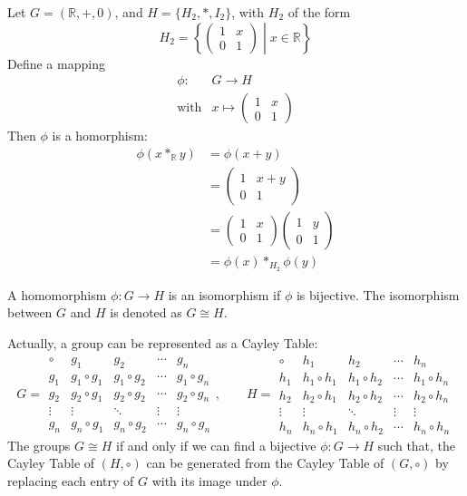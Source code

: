 \begin{example}
Let $G=(\mathbb{R},+,0)$, and $H=\{H_2,*,I_2\}$, with $H_2$ of the form
\[
H_2=\left\{
\begin{pmatrix}
1&x\\0&1
\end{pmatrix}\middle| x\in\mathbb{R}
\right\}
\]
Define a mapping
\[
\begin{array}{ll}
\phi:&G\to H\\\text{with}&x\mapsto\begin{pmatrix}
1&x\\0&1
\end{pmatrix}
\end{array}
\]
Then $\phi$ is a homorphism:
\begin{align*}
\phi(x*_{\mathbb{R}}y)&=\phi(x+y)\\
&=\begin{pmatrix}
1&x+y\\0&1
\end{pmatrix}\\
&=\begin{pmatrix}
1&x\\0&1
\end{pmatrix}\begin{pmatrix}
1&y\\0&1
\end{pmatrix}\\&=\phi(x)*_{H_2}\phi(y)
\end{align*}

\end{example}


\begin{definition}[Isomorphism]
A homomorphism $\phi:G\to H$ is an isomorphism if $\phi$ is bijective.
The isomorphism between $G$ and $H$ is denoted as $G\cong H$.
\end{definition}

Actually, a group can be represented as a Cayley Table:
\[
G=\begin{array}{c|cccc}
\circ & g_1 & g_2 & \cdots & g_n \\
\hline
g_1 & g_1\circ g_1 & g_1\circ g_2 & \cdots & g_1\circ g_n \\
g_2 & g_2\circ g_1 & g_2\circ g_2 & \cdots & g_2\circ g_n \\
\vdots & \vdots & \ddots & \vdots & \vdots \\
g_n & g_n\circ g_1 & g_n\circ g_2 & \cdots & g_n\circ g_n
\end{array},\qquad
H=\begin{array}{c|cccc}
\circ & h_1 & h_2 & \cdots & h_n \\
\hline
h_1 & h_1\circ h_1 & h_1\circ h_2 & \cdots & h_1\circ h_n \\
h_2 & h_2\circ h_1 & h_2\circ h_2 & \cdots & h_2\circ h_n \\
\vdots & \vdots & \ddots & \vdots & \vdots \\
h_n & h_n\circ h_1 & h_n\circ h_2 & \cdots & h_n\circ h_n
\end{array}
\]
The groups $G\cong H$ if and only if we can find a bijective $\phi:G\to H$ such that, the Cayley Table of $(H,\circ)$ can be generated from the Cayley Table of $(G,\circ)$ by replacing each entry of $G$
 with its image under $\phi$.


